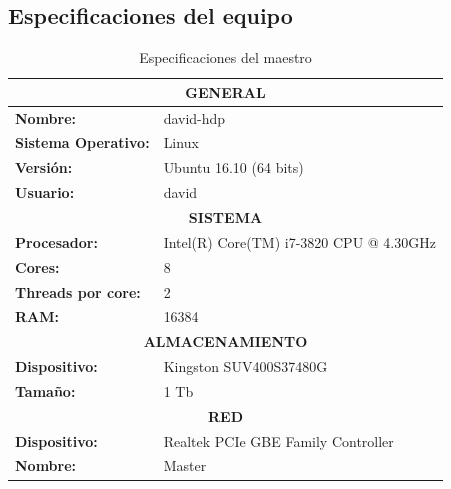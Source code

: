 \subsection{Especificaciones del equipo \label{eqEspec}}
\begin{table}[htp!]
	\centering
	\caption{Especificaciones del maestro}
	\label{maestro}
	\begin{tabular}{|l|l|}
		\hline
		\multicolumn{2}{|c|}{\textbf{GENERAL}}                                 \\ \hline
		\textbf{Nombre:}            & david-hdp		                           \\ \hline
		\textbf{Sistema Operativo:} & Linux                                    \\ \hline
		\textbf{Versión:}           & Ubuntu 16.10 (64 bits)                   \\ \hline
		\textbf{Usuario:}           & david                         	       \\ \hline
		\multicolumn{2}{|c|}{\textbf{SISTEMA}}                                 \\ \hline
		\textbf{Procesador:}        & Intel(R) Core(TM) i7-3820 CPU @ 4.30GHz  \\ \hline
		\textbf{Cores:}             & 8                                        \\ \hline
		\textbf{Threads por core:}  & 2                                        \\ \hline
		\textbf{RAM:}               & 16384                                    \\ \hline
		\multicolumn{2}{|c|}{\textbf{ALMACENAMIENTO}}                          \\ \hline
		\textbf{Dispositivo:}       & Kingston SUV400S37480G                   \\ \hline
		\textbf{Tamaño:}            & 1 Tb	                                   \\ \hline
		\multicolumn{2}{|c|}{\textbf{RED}}                                     \\ \hline
		\textbf{Dispositivo:}       & Realtek PCIe GBE Family Controller       \\ \hline
		\textbf{Nombre:}            & Master                                   \\ \hline
	\end{tabular}
\end{table}

